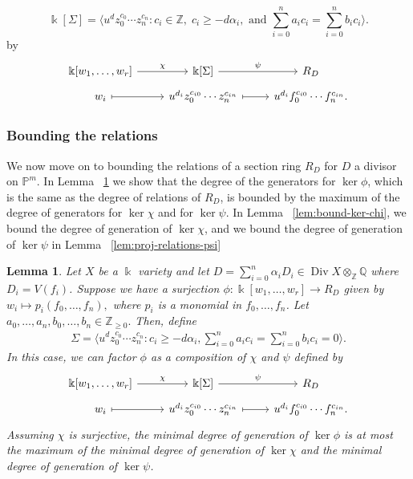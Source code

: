 \documentclass{amsart}
\theoremstyle{plain}
\newtheorem{lem}[thm]{Lemma}
\theoremstyle{definition}
\theoremstyle{remark}
\numberwithin{equation}{section}
\newcommand\sssec{\subsubsection}
\newcommand\bq{{\mathbb Q}}
\newcommand\bp{{\mathbb P}}
\newcommand\bz{{\mathbb Z}}
\newcommand\bk{{\Bbbk}}
\DeclareMathOperator\di{Div}
\newcommand\bida{a}
\newcommand\bidb{b}
\begin{document}
\[
	\bk[\Sigma] =  \langle u^d z_0^{c_0} \cdots z_n^{c_n} \colon c_i \in
\bz, \; c_i \geq -d \alpha_i, \mbox{ and }\sum_{i=0}^{n} \bida_i c_i =
\sum_{i=0}^{n} \bidb_i c_i \rangle. 
\]
by
\begin{equation}
\label{eqn:factor-through-semigroup-ring}
\begin{tikzcd}[baseline=(current  bounding  box.center), row sep = tiny]
\bk[w_1,\ldots, w_r] \ar {r}{\chi} & \bk[\Sigma] \ar {r}{\psi} & R_D \\
w_i \ar[mapsto]{r} & u^{d_i}z_0^{c_{i0}} \cdots z_n^{c_{in}} \ar[mapsto]{r} & u^{d_i}f_0^{c_{i0}} \cdots f_n^{c_{in}}.
\end{tikzcd}
\end{equation}

\sssec*{Bounding the relations}
\label{sssec:relations-projective}

We now move on to bounding the relations of a section ring $R_D$ for $D$ a divisor on $\bp^m$.
In Lemma ~\ref{lem:composite-map} we show that the degree of the
generators for $\ker \phi$, which is the same as the degree of relations
of $R_D$, is bounded by the maximum of the degree of generators for
$\ker \chi$ and for $\ker \psi$.
In Lemma ~\ref{lem:bound-ker-chi}, we bound the degree of generation of
$\ker \chi $, and we bound the degree of generation of $\ker \psi$ in Lemma ~\ref{lem:proj-relations-psi}

\begin{lem}
\label{lem:composite-map}
Let $X$ be a $\bk$ variety and let $D = \sum_{i=0}^{n}\alpha_i D_i\in \di X \otimes_\bz \bq$ where $D_i = V(f_i)$. Suppose we have a
surjection $\phi\colon \bk[w_1,\ldots, w_r] \rightarrow R_D$ given by $w_i
\mapsto p_i(f_0, \ldots, f_n),$ where $p_i$ is a monomial in $f_0,\ldots, f_n$.
Let $\bida_0, \ldots, \bida_n, \bidb_0, \ldots, \bidb_n \in \bz_{\geq 0}.$
Then, define
\begin{align*}
	\Sigma = \langle u^d z_0^{c_0} \cdots z_n^{c_n} : c_i \geq -d \alpha_i, \sum_{i=0}^{n} \bida_i c_i = \sum_{i=0}^{n} \bidb_i c_i = 0 \rangle. 
\end{align*}
In this case, we can factor $\phi$ as a composition of $\chi$ and $\psi$ defined by
\[
\begin{tikzcd}[row sep = tiny]
\bk[w_1,\ldots, w_r] \ar {r}{\chi} & \bk[\Sigma] \ar {r}{\psi} & R_D \\
w_i \arrow[mapsto]{r} & u^{d_i}z_0^{c_{i0}} \cdots z_n^{c_{in}} \arrow[mapsto]{r} & u^{d_i}f_0^{c_{i0}} \cdots f_n^{c_{in}}.
\end{tikzcd}
\]
Assuming $\chi$ is surjective, the minimal degree of generation of $\ker \phi$
is at most the maximum of the minimal degree of generation of $\ker \chi$ and
the minimal degree of generation of $\ker \psi$.
\end{lem}
\end{document}
